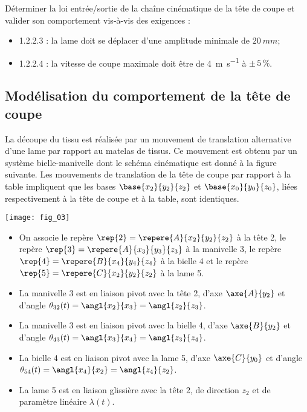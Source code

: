 \fi

\begin{obj}
Déterminer la loi entrée/sortie de la chaîne cinématique de la tête de coupe et valider son
comportement vis-à-vis des exigences :
\begin{itemize}
\item 1.2.2.3 : la lame doit se déplacer d'une amplitude minimale de $\SI{20}{mm}$;
\item 1.2.2.4 : la vitesse de coupe maximale doit être de \SI{4}{m.s^{-1}} à $\pm\,5\,\%$. 
\end{itemize}
\end{obj}

\subsection*{Modélisation du comportement de la tête de coupe}

La découpe du tissu est réalisée par un mouvement de translation alternative d’une lame par rapport
au matelas de tissus. Ce mouvement est obtenu par un système bielle-manivelle dont le schéma cinématique
est donné à la figure suivante. Les mouvements de translation de la tête de coupe par rapport à la
table impliquent que les bases $\base{x_2}{y_2}{z_2}$ et $\base{x_0}{y_0}{z_0}$, liées respectivement à la tête de coupe et à la table, sont identiques.

\begin{marginfigure}
\texttt{[image: fig\_03]}
\end{marginfigure}

\begin{itemize} 
\item On associe le repère $\rep{2}=\repere{A}{x_2}{y_2}{z_2}$ à la tête 2, le repère $\rep{3}=\repere{A}{x_3}{y_3}{z_3}$ à la manivelle 3, le repère $\rep{4}=\repere{B}{x_4}{y_4}{z_4}$ à la bielle 4 et le repère $\rep{5}=\repere{C}{x_2}{y_2}{z_2}$ à la lame 5.
\item La manivelle 3 est en liaison pivot avec la tête 2, d'axe $\axe{A}{y_2}$ et d'angle $\theta_{32}(t)=\angl{x_2}{x_3}=\angl{z_2}{z_3}$.
\item La manivelle 3 est en liaison pivot avec la bielle 4, d'axe $\axe{B}{y_2}$ et d'angle $\theta_{43}(t)=\angl{x_3}{x_4}=\angl{z_3}{z_4}$.
\item La bielle 4 est en liaison pivot avec la lame 5, d'axe $\axe{C}{y_0}$ et d'angle $\theta_{54}(t)=\angl{x_4}{x_2}=\angl{z_4}{z_2}$.
\item La lame 5 est en liaison glissière avec la tête 2, de direction ${z_2}$ et de paramètre linéaire $\lambda(t)$.

\end{itemize}

